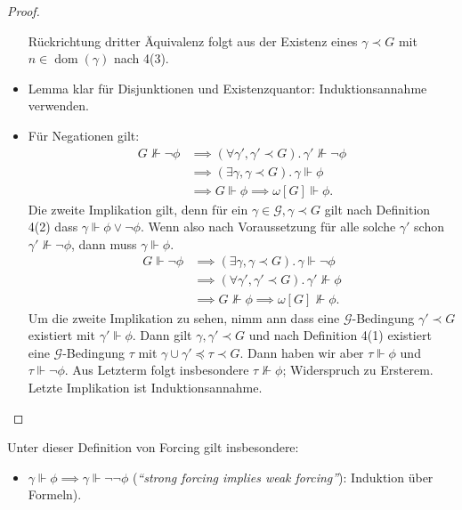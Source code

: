 \documentclass[nofonts]{uebung}
\DeclareMathOperator{\dom}{dom}
\begin{document}
\begin{proof}
\begin{itemize}
            Rückrichtung dritter Äquivalenz folgt aus der Existenz eines $\gamma\prec G$ mit $n\in\dom(\gamma)$ nach 4(3).
        \item Lemma klar für Disjunktionen und Existenzquantor: Induktionsannahme verwenden.
        \item Für Negationen gilt: 
            \begin{align*}
                G\not\Vdash \neg\phi &\implies (\forall \gamma', \gamma'\prec G).\,\gamma'\not\Vdash \neg\phi\\
                                     &\implies (\exists \gamma, \gamma\prec G).\,\gamma\Vdash \phi\\
                                     &\implies G\Vdash\phi \implies \omega[G]\Vdash \phi.
            \end{align*}
            Die zweite Implikation gilt, denn für ein $\gamma\in \mathcal G, \gamma\prec G$ gilt nach Definition 4(2) dass $\gamma\Vdash \phi\lor \neg \phi$.
            Wenn also nach Voraussetzung für alle solche $\gamma'$ schon $\gamma'\not\Vdash \neg\phi$, dann muss $\gamma\Vdash \phi$.
            \begin{align*}
                G\Vdash \neg\phi &\implies (\exists \gamma, \gamma\prec G).\,\gamma\Vdash \neg\phi\\
                                     &\implies (\forall \gamma', \gamma'\prec G).\,\gamma'\not\Vdash \phi\\
                                     &\implies G\not\Vdash\phi \implies \omega[G]\not\Vdash \phi.
            \end{align*}
            Um die zweite Implikation zu sehen, nimm ann dass eine $\mathcal G$-Bedingung $\gamma'\prec G$ existiert mit $\gamma'\Vdash\phi$.
            Dann gilt $\gamma, \gamma'\prec G$ und nach Definition 4(1) existiert eine $\mathcal G$-Bedingung $\tau$ mit $\gamma\cup\gamma'\preceq\tau\prec G$.
            Dann haben wir aber $\tau\Vdash \phi$ und $\tau\Vdash\neg\phi$. Aus Letzterm folgt insbesondere $\tau\not\Vdash\phi$; Widerspruch zu Ersterem. Letzte Implikation ist Induktionsannahme. \qedhere
    \end{itemize}
\end{proof}
Unter dieser Definition von Forcing gilt insbesondere:
\begin{itemize}
    \item $\gamma\Vdash\phi\implies\gamma\Vdash\neg\neg\phi$ (\emph{“strong forcing implies weak forcing”}): Induktion über Formeln).
\end{itemize}
\end{document}
